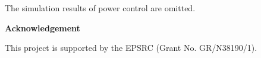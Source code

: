 \documentclass[landscape,a0,final]{a0poster}
\newcommand{\myfig}[3][0]{
\begin{center}
  \vspace{0.5cm}
  \scalebox{0.75}{\texttt{[image: \#2]}}
  \nobreak\medskip
\end{center}}
\newcommand{\mycaption}[1]{
  \vspace{0.8cm}\par
  {\renewcommand{\baselinestretch}{1}\small
   \setbox0=\hbox{\sc Figure \arabic{figure}: \sl #1}
   \ifdim\wd0>\hsize
     {\sc Figure \arabic{figure}: \sl #1}
   \else
     \centerline{\box0}
   \fi
   \par
   \stepcounter{figure}
  }
}
\newcommand{\bp}[4]{%
\begin{minipage}{16.1cm}
  \begin{minipage}{#1}
  #2
  \end{minipage} \hfill \begin{minipage}{#3}
  #4
 \end{minipage}
\end{minipage}
}
\begin{document}
\begin{multicols}{6}
\bp{7.8cm}{
\myfig{../../work/NeutralLeg/50eILINHinf15_c.eps}{1.2}
}{7.8cm}{
\myfig{../../work/NeutralLeg/50uNIcHinf15_c.eps}{1.2} 
}
The simulation results of power control are omitted.

{\bf\large Acknowledgement}

This project is supported by the EPSRC (Grant No. GR/N38190/1).





\end{multicols}
\end{document}
